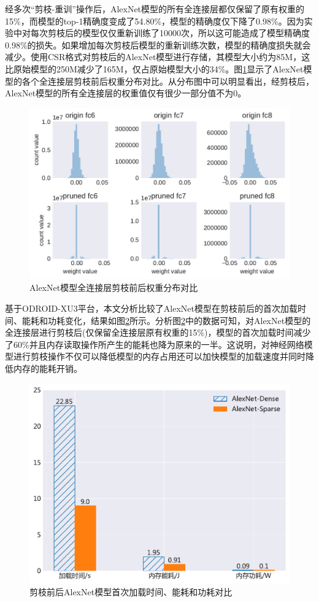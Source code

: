 经多次“剪枝-重训”操作后，AlexNet模型的所有全连接层都仅保留了原有权重的15\%，而模型的top-1精确度变成了54.80\%，模型的精确度仅下降了0.98\%。因为实验中对每次剪枝后的模型仅仅重新训练了10000次，所以这可能造成了模型精确度0.98\%的损失。如果增加每次剪枝后模型的重新训练次数，模型的精确度损失就会减少。使用CSR格式对剪枝后的AlexNet模型进行存储，其模型大小约为85M，这比原始模型的250M减少了165M，仅占原始模型大小的34\%。图\ref{figure:figure24}显示了AlexNet模型的各个全连接层剪枝前后权重分布对比。从分布图中可以明显看出，经剪枝后，AlexNet模型的所有全连接层的权重值仅有很少一部分值不为0。

\begin{figure}[htbp]
    \centering
    \includegraphics[height=0.45\textwidth]{figures/alexnet_pruned_weights.pdf}
    \caption{AlexNet模型全连接层剪枝前后权重分布对比}\label{figure:figure24}
\end{figure}

基于ODROID-XU3平台，本文分析比较了AlexNet模型在剪枝前后的首次加载时间、能耗和功耗变化，结果如图\ref{figure:figure27}所示。分析图\ref{figure:figure27}中的数据可知，对AlexNet模型的全连接层进行剪枝后(仅保留全连接层原有权重的15\%)，模型的首次加载时间减少了60\%并且内存读取操作所产生的能耗也降为原来的一半。这说明，对神经网络模型进行剪枝操作不仅可以降低模型的内存占用还可以加快模型的加载速度并同时降低内存的能耗开销。

\begin{figure}[htbp]
    \centering
    \includegraphics[height=0.4\textwidth]{figures/alexnet_init.pdf}
    \caption{剪枝前后AlexNet模型首次加载时间、能耗和功耗对比}\label{figure:figure27}
\end{figure}

